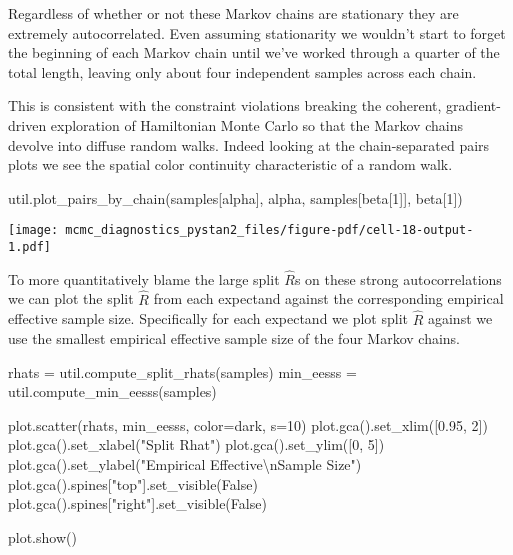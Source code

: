 \documentclass[
  letterpaper,
  DIV=11,
  numbers=noendperiod]{scrartcl}
\newenvironment{Shaded}{\begin{snugshade}}{\end{snugshade}}
\newcommand{\CharTok}[1]{\textcolor[rgb]{0.13,0.47,0.30}{#1}}
\newcommand{\DecValTok}[1]{\textcolor[rgb]{0.68,0.00,0.00}{#1}}
\newcommand{\FloatTok}[1]{\textcolor[rgb]{0.68,0.00,0.00}{#1}}
\newcommand{\NormalTok}[1]{\textcolor[rgb]{0.00,0.23,0.31}{#1}}
\newcommand{\OperatorTok}[1]{\textcolor[rgb]{0.37,0.37,0.37}{#1}}
\newcommand{\StringTok}[1]{\textcolor[rgb]{0.13,0.47,0.30}{#1}}
\newcommand{\VariableTok}[1]{\textcolor[rgb]{0.07,0.07,0.07}{#1}}
\begin{document}
Regardless of whether or not these Markov chains are stationary they are
extremely autocorrelated. Even assuming stationarity we wouldn't start
to forget the beginning of each Markov chain until we've worked through
a quarter of the total length, leaving only about four independent
samples across each chain.

This is consistent with the constraint violations breaking the coherent,
gradient-driven exploration of Hamiltonian Monte Carlo so that the
Markov chains devolve into diffuse random walks. Indeed looking at the
chain-separated pairs plots we see the spatial color continuity
characteristic of a random walk.

\begin{Shaded}
\begin{Highlighting}[]
\NormalTok{util.plot\_pairs\_by\_chain(samples[}\StringTok{\textquotesingle{}alpha\textquotesingle{}}\NormalTok{], }\StringTok{\textquotesingle{}alpha\textquotesingle{}}\NormalTok{, }
\NormalTok{                         samples[}\StringTok{\textquotesingle{}beta[1]\textquotesingle{}}\NormalTok{], }\StringTok{\textquotesingle{}beta[1]\textquotesingle{}}\NormalTok{)}
\end{Highlighting}
\end{Shaded}

\texttt{[image: mcmc\_diagnostics\_pystan2\_files/figure-pdf/cell-18-output-1.pdf]}

To more quantitatively blame the large split \(\hat{R}\)s on these
strong autocorrelations we can plot the split \(\hat{R}\) from each
expectand against the corresponding empirical effective sample size.
Specifically for each expectand we plot split \(\hat{R}\) against we use
the smallest empirical effective sample size of the four Markov chains.

\begin{Shaded}
\begin{Highlighting}[]
\NormalTok{rhats }\OperatorTok{=}\NormalTok{ util.compute\_split\_rhats(samples)}
\NormalTok{min\_eesss }\OperatorTok{=}\NormalTok{ util.compute\_min\_eesss(samples)}

\NormalTok{plot.scatter(rhats, min\_eesss, color}\OperatorTok{=}\NormalTok{dark, s}\OperatorTok{=}\DecValTok{10}\NormalTok{)}
\NormalTok{plot.gca().set\_xlim([}\FloatTok{0.95}\NormalTok{, }\DecValTok{2}\NormalTok{])}
\NormalTok{plot.gca().set\_xlabel(}\StringTok{"Split Rhat"}\NormalTok{)}
\NormalTok{plot.gca().set\_ylim([}\DecValTok{0}\NormalTok{, }\DecValTok{5}\NormalTok{])}
\NormalTok{plot.gca().set\_ylabel(}\StringTok{"Empirical Effective}\CharTok{\textbackslash{}n}\StringTok{Sample Size"}\NormalTok{)}
\NormalTok{plot.gca().spines[}\StringTok{"top"}\NormalTok{].set\_visible(}\VariableTok{False}\NormalTok{)}
\NormalTok{plot.gca().spines[}\StringTok{"right"}\NormalTok{].set\_visible(}\VariableTok{False}\NormalTok{)}

\NormalTok{plot.show()}
\end{Highlighting}
\end{Shaded}
\end{document}
